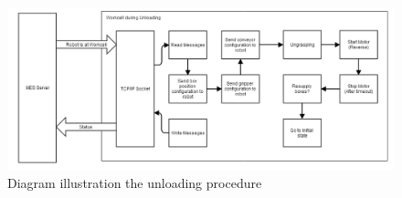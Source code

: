 \begin{figure}[ht]
\centering
\includegraphics[width=\textwidth]{images/overall_block_diagram_unloading.png}
\caption{Diagram illustration the unloading procedure}
\label{fig:overall_block_diagram_unloading}
\end{figure}